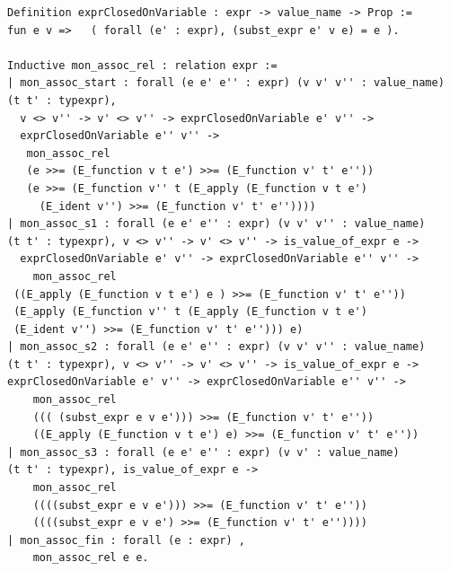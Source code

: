 \documentclass[12pt,twoside,notitlepage]{report}
\theoremstyle{plain}%
\theoremstyle{definition}
\theoremstyle{remark}
\begin{document}
\begin{minipage}{\linewidth}
\begin{lstlisting}[language={Coq}, caption={Monadic associativity},numbersep=11pt]
Definition exprClosedOnVariable : expr -> value_name -> Prop := 
fun e v =>   ( forall (e' : expr), (subst_expr e' v e) = e ).

Inductive mon_assoc_rel : relation expr :=
| mon_assoc_start : forall (e e' e'' : expr) (v v' v'' : value_name) 
(t t' : typexpr), 
  v <> v'' -> v' <> v'' -> exprClosedOnVariable e' v'' ->
  exprClosedOnVariable e'' v'' ->
   mon_assoc_rel 
   (e >>= (E_function v t e') >>= (E_function v' t' e''))
   (e >>= (E_function v'' t (E_apply (E_function v t e') 
     (E_ident v'') >>= (E_function v' t' e''))))
| mon_assoc_s1 : forall (e e' e'' : expr) (v v' v'' : value_name) 
(t t' : typexpr), v <> v'' -> v' <> v'' -> is_value_of_expr e ->
  exprClosedOnVariable e' v'' -> exprClosedOnVariable e'' v'' ->
    mon_assoc_rel 
 ((E_apply (E_function v t e') e ) >>= (E_function v' t' e''))
 (E_apply (E_function v'' t (E_apply (E_function v t e') 
 (E_ident v'') >>= (E_function v' t' e''))) e)
| mon_assoc_s2 : forall (e e' e'' : expr) (v v' v'' : value_name) 
(t t' : typexpr), v <> v'' -> v' <> v'' -> is_value_of_expr e -> 
exprClosedOnVariable e' v'' -> exprClosedOnVariable e'' v'' ->
    mon_assoc_rel 
    ((( (subst_expr e v e'))) >>= (E_function v' t' e''))    
    ((E_apply (E_function v t e') e) >>= (E_function v' t' e''))
| mon_assoc_s3 : forall (e e' e'' : expr) (v v' : value_name) 
(t t' : typexpr), is_value_of_expr e -> 
    mon_assoc_rel 
    ((((subst_expr e v e'))) >>= (E_function v' t' e''))
    ((((subst_expr e v e') >>= (E_function v' t' e''))))
| mon_assoc_fin : forall (e : expr) , 
    mon_assoc_rel e e.
\end{lstlisting}
\end{minipage}
\end{document}
